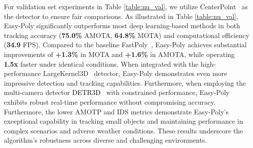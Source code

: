 For validation set experiments in Table \ref{table:nu_val}, we utilize CenterPoint~\cite{yin2021center} as the detector to ensure fair comparisons. As illustrated in Table \ref{table:nu_val}, Easy-Poly significantly outperforms most deep learning-based methods in both tracking accuracy (\textbf{75.0\%} AMOTA, \textbf{64.8\%} MOTA) and computational efficiency (\textbf{34.9} FPS). Compared to the baseline FastPoly~\cite{li2024fast}, Easy-Poly achieves substantial improvements of \textbf{+1.3\%} in MOTA and \textbf{+1.6\%} in AMOTA, while operating \textbf{1.5x} faster under identical conditions. When integrated with the high-performance LargeKernel3D~\cite{chen2022scaling} detector, Easy-Poly demonstrates even more impressive detection and tracking capabilities. Furthermore, when employing the multi-camera detector \textcolor{black}{DETR3D}~\cite{DETR3D} with constrained performance, Easy-Poly exhibits robust real-time performance without compromising accuracy. Furthermore, the lower AMOTP and IDS metrics demonstrate Easy-Poly's exceptional capability in tracking small objects and maintaining performance in complex scenarios and adverse weather conditions. These results underscore the algorithm's robustness across diverse and challenging environments.

